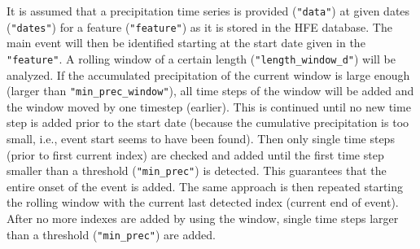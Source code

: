 \documentclass[10pt,a4paper,titlepage,parskip]{scrartcl}
\begin{document}
It is assumed that a precipitation time series is provided (\texttt{"data"}) at given dates (\texttt{"dates"}) for a feature (\texttt{"feature"}) as it is stored in the HFE database. The main event will then be identified starting at the start date given in the
\texttt{"feature"}. A rolling window of a certain length (\texttt{"length\_window\_d"}) will be analyzed. If the accumulated precipitation of the current window is large enough (larger than \texttt{"min\_prec\_window"}), all time steps of the window will be added and the window moved by one timestep (earlier). This is continued until no new time step is added prior to the start date (because the cumulative precipitation is too small, i.e., event start seems to have been found). Then only single time steps (prior to first current index) are checked and added until the first time step smaller than a threshold (\texttt{"min\_prec"}) is detected. This guarantees that the entire onset of the event is added. The same approach is then repeated starting the rolling window with the current
last detected index (current end of event). After no more indexes are added by using the window, single time steps larger
than a threshold (\texttt{"min\_prec"}) are added.
\end{document}
